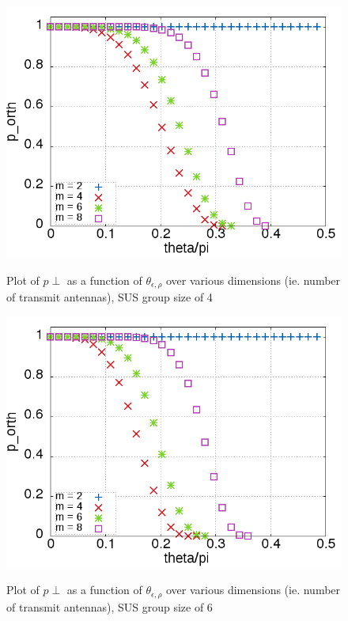 \begin{figure}
    \includegraphics[width=12cm]{figs/p_orth_gs_4.png}\\
    \caption{Plot of $p{\perp}$ as a function of $\theta_{\epsilon,\rho}$ over various dimensions (ie. number of transmit antennas), SUS group size of 4}
    \label{fig:p_orth_gs_4}
\end{figure}

\begin{figure}
    \includegraphics[width=12cm]{figs/p_orth_gs_6.png}\\
    \caption{Plot of $p{\perp}$ as a function of $\theta_{\epsilon,\rho}$ over various dimensions (ie. number of transmit antennas), SUS group size of 6}
    \label{fig:p_orth_gs_6}
\end{figure}

